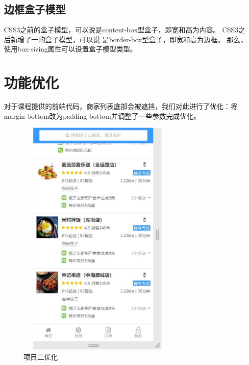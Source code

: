 \subsection{边框盒子模型}
CSS3之前的盒子模型，可以说是content-box型盒子，即宽和高为内容。 CSS3之后新增了一的盒子模型，可以说
是border-box型盒子，即宽和高为边框。 那么，使用box-sizing属性可以设置盒子模型类型。~\\

\section{功能优化}
对于课程提供的前端代码，商家列表底部会被遮挡，我们对此进行了优化：将margin-bottom改为padding-bottom并调整了一些参数完成优化。

\begin{figure}[H]
    \centering
    \includegraphics[width=8cm,height=12cm]{figures/improve2.png}
    \caption{项目二优化}
\end{figure}


